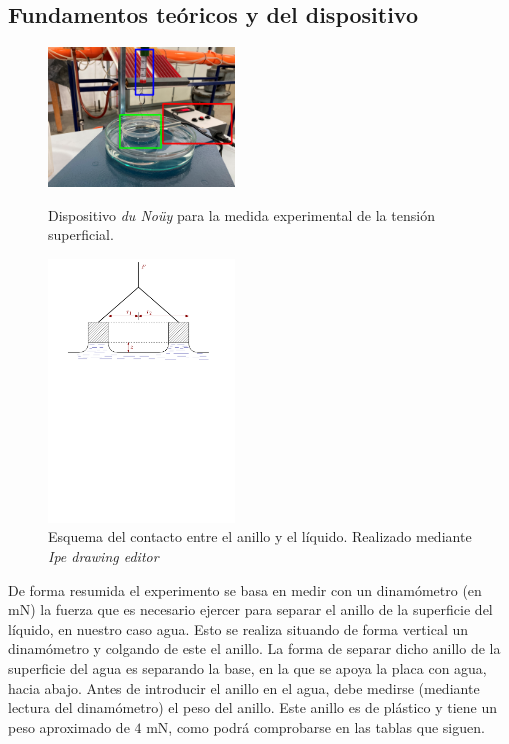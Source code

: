 \documentclass[12pt,a4paper]{article}
\begin{document}
\subsection*{Fundamentos teóricos y del dispositivo}
\begin{figure}
\vspace{-0.5cm}
 	 \begin{center}
  \includegraphics[width=0.44\textwidth]{fotos/tension_superficial_1}
  	 \end{center}
  	\caption{Dispositivo  \emph{du Noüy} para la medida experimental de la tensión superficial.}
  	\label{fig1}
  	
  	\begin{center}
 \includegraphics[width=0.44\textwidth]{fotos/esquema_1}
  	\end{center}
  	\caption{Esquema del contacto entre el anillo y el líquido. Realizado mediante \textsl{Ipe drawing editor}}
  	\label{fig2}
\end{figure}
De forma resumida el experimento se basa en medir con un dinamómetro (en mN) la fuerza que es necesario ejercer para separar el anillo de la superficie del líquido, en nuestro caso agua. Esto se realiza situando de forma vertical un dinamómetro y colgando de este el anillo.
La forma de separar dicho anillo de la superficie del agua es separando la base, en la que se apoya la placa con agua, hacia abajo. Antes de introducir el anillo en el agua, debe medirse (mediante lectura del dinamómetro) el peso del anillo. Este anillo es de plástico y tiene un peso aproximado de $4$ mN, como podrá comprobarse en las tablas que siguen. 
\end{document}
